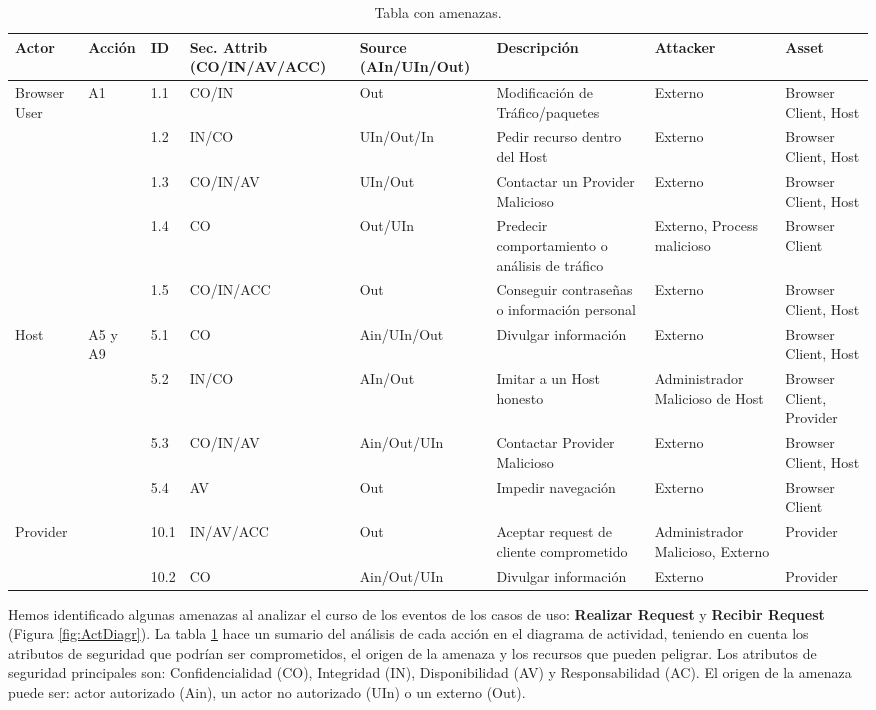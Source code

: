 \begin{landscape}%
\begin{table}[h!t]
\caption{Tabla con amenazas.}
\centering
\begin{tabular}{ |m{3.5em}|m{2.5em}|m{1.5em}|m{6em}|m{6em}|m{10em}|m{6em}|m{7em}|} 
\hline
Actor & Acción & ID & Sec. Attrib (CO/IN/AV/ACC) & Source (AIn/UIn/Out) & Descripción & Attacker & Asset\\
\hline
\multirow{5}{1em}{Browser User} & \multirow{5}{1em}{A1} & 1.1 & CO/IN & Out & Modificación de Tráfico/paquetes & Externo & Browser Client, Host\\ 
& & 1.2 & IN/CO & UIn/Out/In & Pedir recurso dentro del Host & Externo & Browser Client, Host\\
& & 1.3 & CO/IN/AV & UIn/Out & Contactar un Provider Malicioso & Externo & Browser Client, Host\\
& & 1.4 & CO & Out/UIn & Predecir comportamiento o análisis de tráfico & Externo, Process malicioso & Browser Client\\
& & 1.5 & CO/IN/ACC & Out & Conseguir contraseñas o información personal & Externo & Browser Client, Host\\
\hline
\multirow{4}{1em}{Host} & \multirow{5}{1em}{A5 y A9} & 5.1 & CO & Ain/UIn/Out & Divulgar información & Externo & Browser Client, Host\\ 
& & 5.2 & IN/CO & AIn/Out & Imitar a un Host honesto & Administrador Malicioso de Host & Browser Client, Provider\\
& & 5.3 & CO/IN/AV & Ain/Out/UIn & Contactar Provider Malicioso & Externo & Browser Client, Host\\
& & 5.4 & AV & Out & Impedir navegación & Externo & Browser Client\\
\hline
\multirow{2}{1em}{Provider} & \multirow{5}{1em}{A10} & 10.1 & IN/AV/ACC & Out & Aceptar request de cliente comprometido & Administrador Malicioso, Externo & Provider\\ 
& & 10.2 & CO & Ain/Out/UIn & Divulgar información & Externo & Provider\\

\hline
\end{tabular}
\label{tab:threats}
\end{table}
\end{landscape}

Hemos identificado algunas amenazas al analizar el curso de los eventos de los casos de uso: \textbf{Realizar Request} y \textbf{Recibir Request} (Figura \ref{fig:ActDiagr}). La tabla \ref{tab:threats} hace un sumario del análisis de cada acción en el diagrama de actividad, teniendo en cuenta los atributos de seguridad que podrían ser comprometidos, el origen de la amenaza y los recursos que pueden peligrar. Los atributos de seguridad principales son: Confidencialidad (CO), Integridad (IN), Disponibilidad (AV) y Responsabilidad (AC). El origen de la amenaza puede ser: actor autorizado (Ain), un actor no autorizado (UIn) o un externo (Out).

